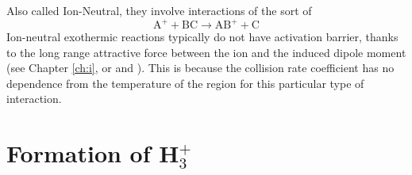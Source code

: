 Also called Ion-Neutral, they involve interactions of the sort of 
\begin{equation*}
    \text{A}^{+}+\text{BC} \to \text{AB}^{+} +\text{C}
\end{equation*}
Ion-neutral exothermic reactions typically do not have activation barrier, thanks to the long range attractive force between the ion and the induced dipole moment (see Chapter \ref{ch:i}, or \cite{1986ApJS...62..553A} and \cite{1973ApJ...185..505H}). This is because the collision rate coefficient has no dependence from the temperature of the region for this particular type of interaction.

\section{Formation of H$_{3}^{+}$}

